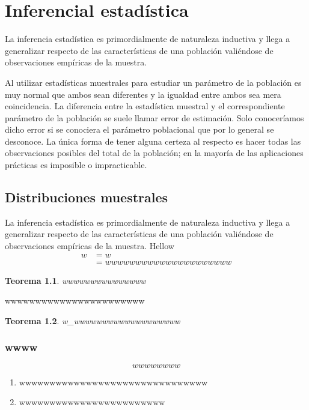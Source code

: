 \documentclass[a4paper]{report}
\newtheorem{thm}{Teorema}[chapter]
\begin{document}
\part{Inferencial estadística}
La inferencia estadística es primordialmente de naturaleza
inductiva y llega a generalizar respecto de las características de
una población valiéndose de observaciones empíricas de la
muestra.

Al utilizar estadísticas muestrales para estudiar un parámetro
de la población es muy normal que ambos sean diferentes y la
igualdad entre ambos sea mera coincidencia. La diferencia
entre la estadística muestral y el correspondiente parámetro
de la población se suele llamar error de estimación. Solo
conoceríamos dicho error si se conociera el parámetro
poblacional que por lo general se desconoce. La única forma
de tener alguna certeza al respecto es hacer todas las
observaciones posibles del total de la población; en la mayoría
de las aplicaciones prácticas es imposible o impracticable.


\chapter{Distribuciones muestrales}
La inferencia estadística es primordialmente de naturaleza
inductiva y llega a generalizar respecto de las características de
una población valiéndose de observaciones empíricas de la
muestra.
  	Hellow
\begin{align*}
	w&=w\\
	 &=wwwwwwwwwwwwwwwwwwwww 
\end{align*}

\begin{thm}
	wwwwwwwwwwwwwww
	  
\end{thm}
wwwwwwwwwwwwwwwwwwwwwww
\begin{thm}
	w_wwwwwwwwwwwwwwwwwww
\end{thm}
\section{wwww}
\begin{equation}
	wwwwwwww
	\label{wwwww}
\end{equation}
\begin{enumerate}
	\item wwwwwwwwwwwwwwwwwwwwwwwwwwwwwww
	\item wwwwwwwwwwwwwwwwwwwwwwww
\end{enumerate}
\end{document}
